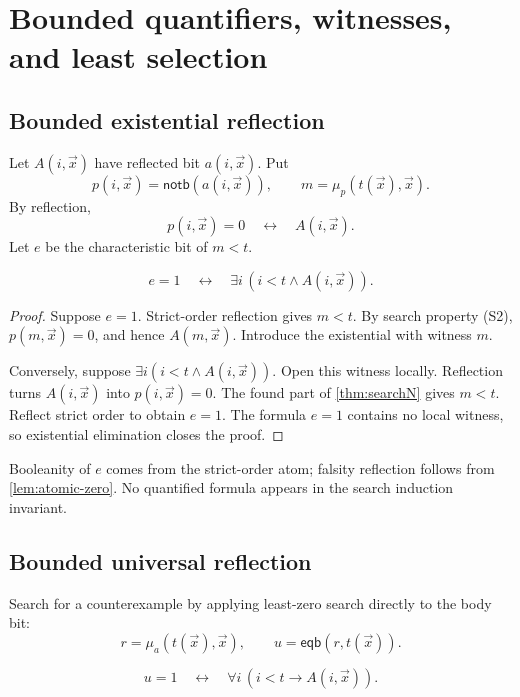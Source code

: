\section{Bounded quantifiers, witnesses, and least selection}
\label{sec:quantifiers}

\subsection{Bounded existential reflection}

Let \(A(i,\vec x)\) have reflected bit \(a(i,\vec x)\).  Put
\[
  p(i,\vec x)=\mathsf{notb}(a(i,\vec x)),
  \qquad
  m=\mu_p(t(\vec x),\vec x).
\]
By reflection,
\[
   p(i,\vec x)=0\quad\leftrightarrow\quad A(i,\vec x).
\]
Let \(e\) be the characteristic bit of \(m<t\).

\begin{lemma}
\label{lem:exists-reflection}
\[
 e=1\quad\leftrightarrow\quad
 \exists i\,(i<t\wedge A(i,\vec x)).
\]
\end{lemma}

\begin{proof}
Suppose \(e=1\).  Strict-order reflection gives \(m<t\).  By search property
(S2), \(p(m,\vec x)=0\), and hence \(A(m,\vec x)\).  Introduce the existential
with witness \(m\).

Conversely, suppose \(\exists i(i<t\wedge A(i,\vec x))\).  Open this witness
locally.  Reflection turns \(A(i,\vec x)\) into \(p(i,\vec x)=0\).  The found
part of \cref{thm:searchN} gives \(m<t\).  Reflect strict order to obtain
\(e=1\).  The formula \(e=1\) contains no local witness, so existential
elimination closes the proof.
\end{proof}

Booleanity of \(e\) comes from the strict-order atom; falsity reflection follows
from \cref{lem:atomic-zero}.  No quantified formula appears in the search
induction invariant.

\subsection{Bounded universal reflection}

Search for a counterexample by applying least-zero search directly to the body
bit:
\[
  r=\mu_a(t(\vec x),\vec x),
  \qquad
  u=\mathsf{eqb}(r,t(\vec x)).
\]

\begin{lemma}
\label{lem:forall-reflection}
\[
 u=1\quad\leftrightarrow\quad
 \forall i\,(i<t\to A(i,\vec x)).
\]
\end{lemma}

